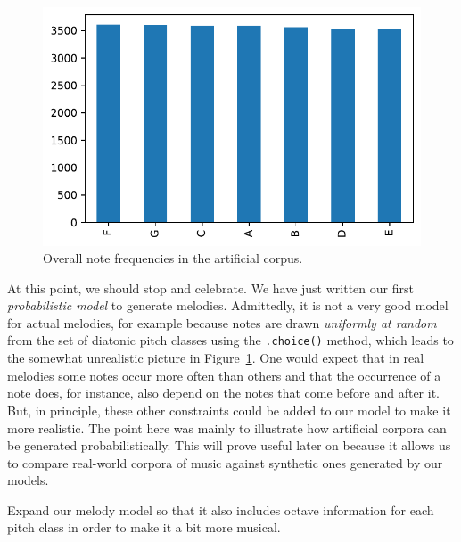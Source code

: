 \documentclass[
  a4paperpaper,
  ,captions=tableheading
]{scrbook}
\begin{document}
\begin{figure}[H]

{\centering \includegraphics{randomness_files/figure-pdf/fig-note-freqs-output-1.pdf}

}

\caption{\label{fig-note-freqs}Overall note frequencies in the
artificial corpus.}

\end{figure}

At this point, we should stop and celebrate. We have just written our
first \emph{probabilistic model} to generate melodies. Admittedly, it is
not a very good model for actual melodies, for example because notes are
drawn \emph{uniformly at random} from the set of diatonic pitch classes
using the \texttt{.choice()} method, which leads to the somewhat
unrealistic picture in Figure~\ref{fig-note-freqs}. One would expect
that in real melodies some notes occur more often than others and that
the occurrence of a note does, for instance, also depend on the notes
that come before and after it. But, in principle, these other
constraints could be added to our model to make it more realistic. The
point here was mainly to illustrate how artificial corpora can be
generated probabilistically. This will prove useful later on because it
allows us to compare real-world corpora of music against synthetic ones
generated by our models.

\begin{tcolorbox}[enhanced jigsaw, arc=.35mm, colbacktitle=quarto-callout-tip-color!10!white, colback=white, breakable, toprule=.15mm, title=\textcolor{quarto-callout-tip-color}{\faLightbulb}\hspace{0.5em}{Exercise}, left=2mm, bottomtitle=1mm, toptitle=1mm, leftrule=.75mm, opacitybacktitle=0.6, titlerule=0mm, opacityback=0, rightrule=.15mm, bottomrule=.15mm, coltitle=black, colframe=quarto-callout-tip-color-frame]

Expand our melody model so that it also includes octave information for
each pitch class in order to make it a bit more musical.

\end{tcolorbox}
\end{document}
